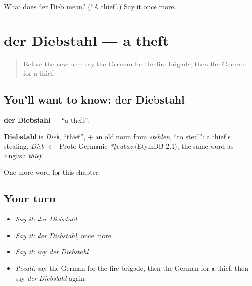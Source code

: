 \begin{tcolorbox}[breakable,colback=teal!4,colframe=teal!35!black,title={Before you move on}]
What does der Dieb mean? (\textquotedblleft{}A thief\textquotedblright{}.) Say it once more.
\end{tcolorbox}
\section[der Diebstahl]{der Diebstahl — a theft}

\label{lesson:GE-C207-diebstahl}



\begin{quote}
Before the new one: say the German for the fire brigade, then the German for a thief.
\end{quote}

\subsection*{You'll want to know: der Diebstahl}
\textbf{der Diebstahl} — \textquotedblleft{}a theft\textquotedblright{}.

\begin{cousinweb}
\textbf{Diebstahl} is \emph{Dieb}, \textquotedblleft{}thief\textquotedblright{}, + an old noun from \emph{stehlen}, \textquotedblleft{}to steal\textquotedblright{}: a thief's stealing. \emph{Dieb} $\leftarrow$ Proto-Germanic \emph{*þeubaz} (EtymDB 2.1), the same word as English \emph{thief}.
\end{cousinweb}

\begin{grammarlens}[title={What you've built}]
One more word for this chapter.
\end{grammarlens}

\subsection*{Your turn}
\begin{itemize}
\raggedright
  \item \emph{Say it:} \emph{der Diebstahl}
  \item \emph{Say it:} \emph{der Diebstahl}, once more
  \item \emph{Say it:} say \emph{der Diebstahl}
  \item \emph{Recall:} say the German for the fire brigade, then the German for a thief, then say \emph{der Diebstahl} again
\end{itemize}

